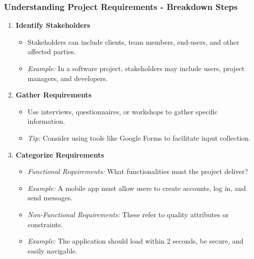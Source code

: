 \documentclass[aspectratio=169]{beamer}
\begin{document}
\begin{frame}[fragile]
    \frametitle{Understanding Project Requirements - Breakdown Steps}
    \begin{enumerate}
        \item \textbf{Identify Stakeholders}
            \begin{itemize}
                \item Stakeholders can include clients, team members, end-users, and other affected parties.
                \item \textit{Example:} In a software project, stakeholders may include users, project managers, and developers.
            \end{itemize}
        \item \textbf{Gather Requirements}
            \begin{itemize}
                \item Use interviews, questionnaires, or workshops to gather specific information.
                \item \textit{Tip:} Consider using tools like Google Forms to facilitate input collection.
            \end{itemize}
        \item \textbf{Categorize Requirements}
            \begin{itemize}
                \item \textit{Functional Requirements:} What functionalities must the project deliver? 
                \item \textit{Example:} A mobile app must allow users to create accounts, log in, and send messages.
                \item \textit{Non-Functional Requirements:} These refer to quality attributes or constraints.
                \item \textit{Example:} The application should load within 2 seconds, be secure, and easily navigable.
            \end{itemize}
    \end{enumerate}
\end{frame}
\end{document}

